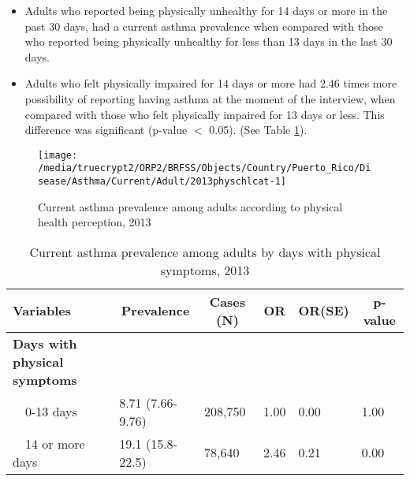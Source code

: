  
\newpage

 \newpage
\begin{itemize}

\item Adults who reported being physically unhealthy for 14 days or more in the past 30 days, had a  
 current asthma prevalence when compared with 
those who reported being physically unhealthy for less than 13 days in the last 30 days.


\item Adults who felt physically impaired for 14 days or more had 2.46 times more possibility of reporting having asthma at the moment of the interview, when compared with those who felt physically impaired for 13 days or less. This difference was significant (p-value $<$ 0.05). (See Table \ref{tab:phys.Asthma.2013}).

\end{itemize}

\begin{figure}[H]
\caption{Current asthma prevalence among adults according to physical health perception, 2013}
\label{fig:phys.Asthma.2013}
\begin{knitrout}
\color{fgcolor}

{\centering \texttt{[image: /media/truecrypt2/ORP2/BRFSS/Objects/Country/Puerto\_Rico/Disease/Asthma/Current/Adult/2013physchlcat-1]} 

}



\end{knitrout}
 \end{figure}

\begin{table}[H]
\caption{Current asthma prevalence among adults by days with physical symptoms, 2013\label{tab:phys.Asthma.2013}} 
\begin{center}
\begin{tabular}{llllll}
\hline\hline
\multicolumn{1}{l}{Variables}&\multicolumn{1}{c}{Prevalence}&\multicolumn{1}{c}{Cases (N)}&\multicolumn{1}{c}{OR}&\multicolumn{1}{c}{OR(SE)}&\multicolumn{1}{c}{p-value}\tabularnewline
\hline
{\bfseries Days with physical symptoms}&&&&&\tabularnewline
~~0-13 days&8.71 (7.66-9.76)&208,750&1.00&0.00&1.00\tabularnewline
~~14 or more days&19.1 (15.8-22.5)& 78,640&2.46&0.21&0.00\tabularnewline
\hline
\end{tabular}\end{center}

\end{table}


